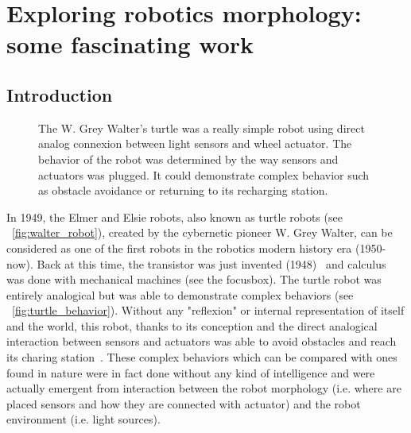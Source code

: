 
\cleartoleftpage



\chapter{Exploring robotics morphology: some fascinating work} %


\section{Introduction} %

\begin{figure}[!b]
\centering
    \hfil
    \caption{The W. Grey Walter's turtle was a really simple robot using direct analog connexion between light sensors and wheel actuator. The behavior of the robot was determined by the way sensors and actuators was plugged. It could demonstrate complex behavior such as obstacle avoidance or returning to its recharging station.}
    \label{fig:turtle_robot}
\end{figure}



In 1949, the Elmer and Elsie robots, also known as turtle robots (see \figurename~\ref{fig:walter_robot}), created by the cybernetic pioneer W. Grey Walter, can be considered as one of the first robots in the robotics modern history era (1950-now). Back at this time, the transistor was just invented (1948)~\cite{brinkman1997history} and calculus was done with mechanical machines (see the focusbox). The turtle robot was entirely analogical but was able to demonstrate complex behaviors (see \figurename~\ref{fig:turtle_behavior}). Without any "reflexion" or internal representation of itself and the world, this robot, thanks to its conception and the direct analogical interaction between sensors and actuators was able to avoid obstacles and reach its charing station~\cite{walter1950imitation}.
These complex behaviors which can be compared with ones found in nature were in fact done without any kind of intelligence and were actually emergent from interaction between the robot morphology (i.e. where are placed sensors and how they are connected with actuator) and the robot environment (i.e. light sources).

